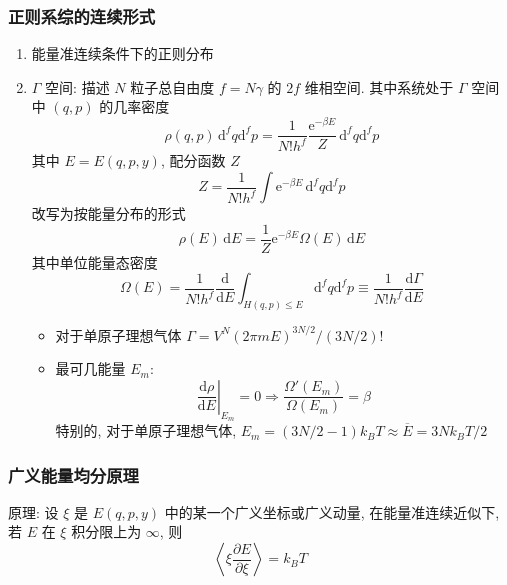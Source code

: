 \documentclass[12pt,a4paper]{article}%
\numberwithin{equation}{section}
\newcommand{\dif}{\mathrm{d}}
\newcommand{\diff}{\,\mathrm{d}}
\newcommand\e{\mathrm{e}}%
\begin{document}
\subsubsection{正则系综的连续形式} %
\label{ssub:canonical_continuous}
\begin{enumerate}
    \item 能量准连续条件下的正则分布
    \item $\Gamma$ 空间: 描述 $N$ 粒子总自由度 $f = N\gamma$ 的 $2f$ 维相空间. 其中系统处于 $\Gamma$ 空间中 $(q,p)$ 的几率密度
    \begin{equation}
        \rho(q,p)\diff^f q\dif^f p = \frac 1{N!h^f}\frac{\e^{-\beta E}}{Z}\diff^f q\dif^f p
    \end{equation}
    其中 $E = E(q,p,y)$, 配分函数 $Z$
    \begin{equation}
        Z = \frac1{N!h^f}\int\e^{-\beta E}\diff^f q\dif^f p
    \end{equation}
    改写为按能量分布的形式
    \begin{equation}
        \rho(E)\diff E = \frac 1Z \e^{-\beta E}\Omega(E)\diff E
    \end{equation}
    其中单位能量态密度
    \begin{equation}
        \Omega(E) = \frac 1{N! h^f} \frac{\dif}{\dif E}\int_{H(q,p)\le E}\dif^f q\dif^f p \equiv \frac 1{N! h^f} \frac{\dif\Gamma}{\dif E}
    \end{equation}
    \begin{itemize}
        \item 对于单原子理想气体 $\Gamma = V^N(2\pi mE)^{3N/2}/(3N/2)!$
        \item 最可几能量 $E_m$: 
        \begin{equation}
            \left.\frac{\dif\rho}{\dif E}\right|_{E_m} = 0 
            \Rightarrow \frac{\Omega'(E_m)}{\Omega(E_m)} = \beta
        \end{equation}
        特别的, 对于单原子理想气体, $E_m = (3N/2 - 1)k_BT \approx \overline E = 3Nk_BT/2$
    \end{itemize}
\end{enumerate}
\subsubsection{广义能量均分原理} %
\label{ssub:general_equipartition}
原理: 设 $\xi$ 是 $E(q,p,y)$ 中的某一个广义坐标或广义动量, 在能量准连续近似下, 若 $E$ 在 $\xi$ 积分限上为 $\infty$, 则
\begin{equation}
    \left\langle\xi\frac{\partial E}{\partial\xi}\right\rangle = k_BT
\end{equation}
\end{document}
